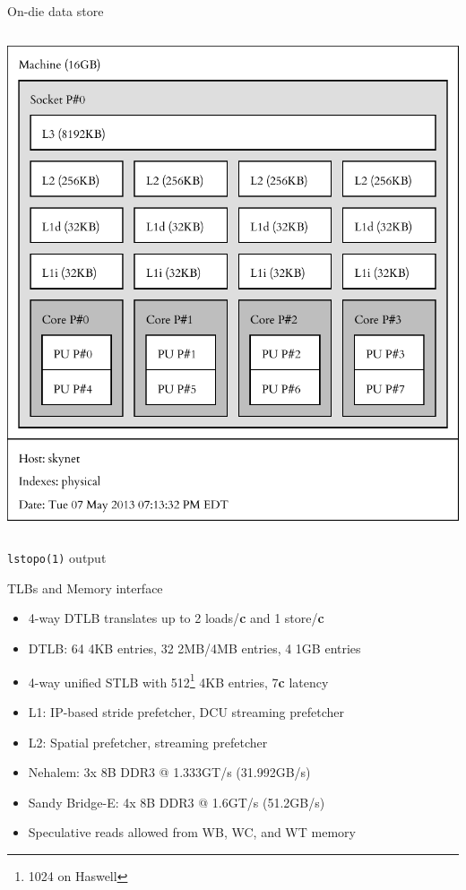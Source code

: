 \documentclass[mathserif,xcolor={dvipsnames,table}]{beamer}
\begin{document}
\begin{frame}{On-die data store}
\begin{columns}
\begin{column}{0.5\textwidth}
\includegraphics[scale=.4]{images/skynet.pdf}
\end{column}
\end{columns}
\hfill
\tiny{\texttt{lstopo(1)} output}
\end{frame}

\begin{frame}{TLBs and Memory interface}
\begin{itemize}
\item 4-way DTLB translates up to 2 loads/\textbf{c} and 1 store/\textbf{c}
\item DTLB: 64 4KB entries, 32 2MB/4MB entries, 4 1GB entries
\item 4-way unified STLB with 512\footnote{1024 on Haswell} 4KB entries, 7\textbf{c} latency
\item L1: IP-based stride prefetcher, DCU streaming prefetcher
\item L2: Spatial prefetcher, streaming prefetcher
\item Nehalem: 3x 8B DDR3 @ 1.333GT/s (31.992GB/s)
\item Sandy Bridge-E: 4x 8B DDR3 @ 1.6GT/s (51.2GB/s)
\item Speculative reads allowed from WB, WC, and WT memory
\end{itemize}
\end{frame}
\end{document}

